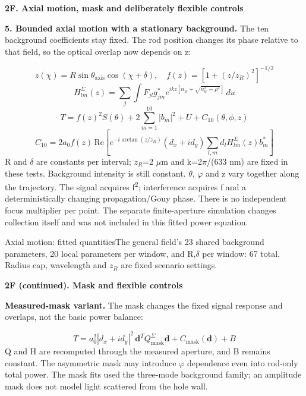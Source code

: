 \documentclass[10pt,a4paper]{article}
\newcommand{\heading}[1]{{\sffamily\Large\bfseries\color{ink}#1}\par\vspace{7pt}}
\begin{document}
\clearpage
\heading{2F. Axial motion, mask and deliberately flexible controls}
\textbf{5. Bounded axial motion with a stationary background.} The ten background coefficients stay fixed. The rod position changes its phase relative to that field, so the optical overlap now depends on z:\par
\begin{equation*}z(\chi)=R\sin\theta_{\mathrm{axis}}\cos(\chi+\delta),\quad f(z)=[1+(z/z_R)^2]^{-1/2}\end{equation*}
\begin{equation*}H^{\Sigma}_{lm}(z)=\sum_j\int F_{jl}g_{jm}^*e^{ikz[n_w+\sqrt{n_w^2-\rho^2}]}\,du\end{equation*}
\begin{equation*}T=f(z)^2S(\theta)+2\sum_{m=1}^{10}|b_m|^2+U+C_{10}(\theta,\phi,z)\end{equation*}
\begin{equation*}C_{10}=2a_0 f(z)\,\mathrm{Re}\!\left[e^{-i\arctan(z/z_R)}(d_x+i d_y)\sum_{l,m}d_l H^{\Sigma}_{lm}(z)b_m^*\right]\end{equation*}
R and \(δ\) are constants per interval; \(z_{R}\)=2 \(\mu\)m and k=2\(π\)/(633 nm) are fixed in these tests. Background intensity is still constant. \(θ\), \(φ\) and z vary together along the trajectory. The signal acquires f\textsuperscript{2}; interference acquires f and a deterministically changing propagation/Gouy phase. There is no independent focus multiplier per point. The separate finite-aperture simulation changes collection itself and was not included in this fitted power equation.\par
\begin{fitbox}{Axial motion: fitted quantities}The general field’s 23 shared background parameters, 20 local parameters per window, and R,\(δ\) per window: 67 total. Radius cap, wavelength and \(z_{R}\) are fixed scenario settings.\end{fitbox}
\clearpage
\heading{2F (continued). Mask and flexible controls}
\textbf{Measured-mask variant.} The mask changes the fixed signal response and overlaps, not the basic power balance:\par
\begin{equation*}T=a_0^2|d_x+i d_y|^2\,\mathbf{d}^{T}Q^{\Sigma}_{\mathrm{mask}}\mathbf{d}+C_{\mathrm{mask}}(\mathbf{d})+B\end{equation*}
Q and H are recomputed through the measured aperture, and B remains constant. The asymmetric mask may introduce \(φ\) dependence even into rod-only total power. The mask fits used the three-mode background family; an amplitude mask does not model light scattered from the hole wall.\par
\end{document}
